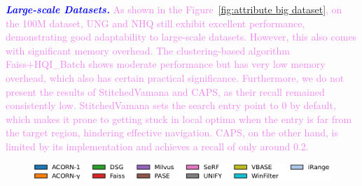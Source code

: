 \documentclass[sigconf, nonacm]{acmart}
\begin{document}
{	\textit{\textbf{\textcolor{blue}{Large-scale Datasets.}}} 
	\textcolor{violet}{As shown in the Figure~\ref{fig:attribute big dataset}, on the 100M dataset, UNG and NHQ still exhibit excellent performance, demonstrating good adaptability to large-scale datasets. However, this also comes with significant memory overhead. The clustering-based algorithm Faiss+HQI\_Batch shows moderate performance but has very low memory overhead, which also has certain practical significance. Furthermore, we do not present the results of StitchedVamana and CAPS, as their recall remained consistently low. StitchedVamana sets the search entry point to 0 by default, which makes it prone to getting stuck in local optima when the entry is far from the target region, hindering effective navigation. CAPS, on the other hand, is limited by its implementation and achieves a recall of only around 0.2.}
	
	
	
	


	\begin{figure}[t]
		\centering
		
		
		\hspace*{5pt}
		\includegraphics[width=0.98\columnwidth]{figures/indexData/rangeFilter_legend_only.pdf}
		
		

\end{figure}}
\end{document}
